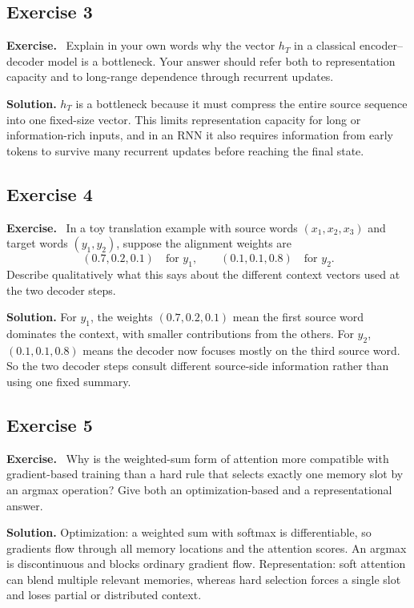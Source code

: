 \documentclass[11pt]{article}
\newenvironment{exercisebox}{\begin{framed}\noindent\textbf{Exercise.}\ }{\end{framed}}
\begin{document}
\subsection*{Exercise 3}
\begin{exercisebox}
Explain in your own words why the vector $h_T$ in a classical encoder--decoder model is a bottleneck.
Your answer should refer both to representation capacity and to long-range dependence through recurrent updates.
\end{exercisebox}
\textbf{Solution.} $h_T$ is a bottleneck because it must compress the entire source sequence into one fixed-size vector. This limits representation capacity for long or information-rich inputs, and in an RNN it also requires information from early tokens to survive many recurrent updates before reaching the final state.

\subsection*{Exercise 4}
\begin{exercisebox}
In a toy translation example with source words $(x_1,x_2,x_3)$ and target words $(y_1,y_2)$, suppose the alignment weights are
\[
(0.7,0.2,0.1)\quad\text{for }y_1,
\qquad
(0.1,0.1,0.8)\quad\text{for }y_2.
\]
Describe qualitatively what this says about the different context vectors used at the two decoder steps.
\end{exercisebox}
\textbf{Solution.} For $y_1$, the weights $(0.7,0.2,0.1)$ mean the first source word dominates the context, with smaller contributions from the others. For $y_2$, $(0.1,0.1,0.8)$ means the decoder now focuses mostly on the third source word. So the two decoder steps consult different source-side information rather than using one fixed summary.

\subsection*{Exercise 5}
\begin{exercisebox}
Why is the weighted-sum form of attention more compatible with gradient-based training than a hard rule that selects exactly one memory slot by an argmax operation?
Give both an optimization-based and a representational answer.
\end{exercisebox}
\textbf{Solution.} Optimization: a weighted sum with softmax is differentiable, so gradients flow through all memory locations and the attention scores. An argmax is discontinuous and blocks ordinary gradient flow. Representation: soft attention can blend multiple relevant memories, whereas hard selection forces a single slot and loses partial or distributed context.
\end{document}
